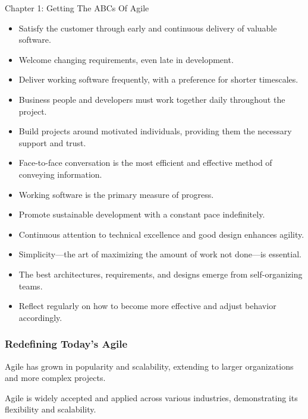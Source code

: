 \begin{notes}{Chapter 1: Getting The ABCs Of Agile}
\begin{highlight}
        \begin{itemize}
            \item Satisfy the customer through early and continuous delivery of valuable software.
            \item Welcome changing requirements, even late in development.
            \item Deliver working software frequently, with a preference for shorter timescales.
            \item Business people and developers must work together daily throughout the project.
            \item Build projects around motivated individuals, providing them the necessary support and trust.
            \item Face-to-face conversation is the most efficient and effective method of conveying information.
            \item Working software is the primary measure of progress.
            \item Promote sustainable development with a constant pace indefinitely.
            \item Continuous attention to technical excellence and good design enhances agility.
            \item Simplicity—the art of maximizing the amount of work not done—is essential.
            \item The best architectures, requirements, and designs emerge from self-organizing teams.
            \item Reflect regularly on how to become more effective and adjust behavior accordingly.
        \end{itemize}
    
    \end{highlight}
    
    \subsubsection*{Redefining Today's Agile}
    
    Agile has grown in popularity and scalability, extending to larger organizations and more complex projects.
    
    \begin{highlight}
    
        Agile is widely accepted and applied across various industries, demonstrating its flexibility and scalability.
        

\end{highlight}
\end{notes}
